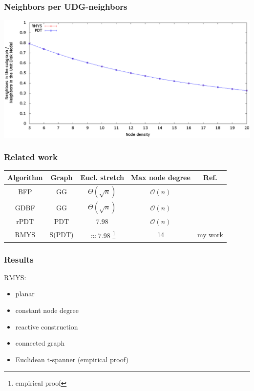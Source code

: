 \documentclass[compress]{beamer}
\begin{document}
\begin{frame} 
\frametitle{Neighbors per UDG-neighbors}
\center	\includegraphics[width=1.0\linewidth]{RMYS_PDT_UDGNeighborsRatio.eps}
\end{frame}

\begin{frame}
\frametitle{Related work}
\begin{table}[h!]
\centering
\hspace*{-5mm}
\begin{tabular}{ccccc}
\hline 
Algorithm & Graph & Eucl. stretch & Max node degree & Ref. \\ 
\hline
BFP & GG & $\Theta{(\sqrt{n})} $ & $\mathcal{O}(n) $ & \cite{Ruhrup2010} \\ 

GDBF & GG & $\Theta{(\sqrt{n})} $ & $\mathcal{O}(n) $ & \cite{Chawla2006} \\ 

rPDT & PDT & $7.98 $ & $\mathcal{O}(n) $ & \cite{pdt, Neumann2012} \\ 

RMYS & S(PDT) & $\approx 7.98 $ \footnote{empirical proof} & 14 & my work \\
\hline 
\end{tabular} 
\label{table:topologies}
\end{table}
\end{frame}

\begin{frame}
\frametitle{Results}
RMYS:
\begin{itemize}
\item planar
\item constant node degree
\item reactive construction
\item connected graph
\item Euclidean t-spanner (empirical proof)
\end{itemize}
\end{frame}
\end{document}
